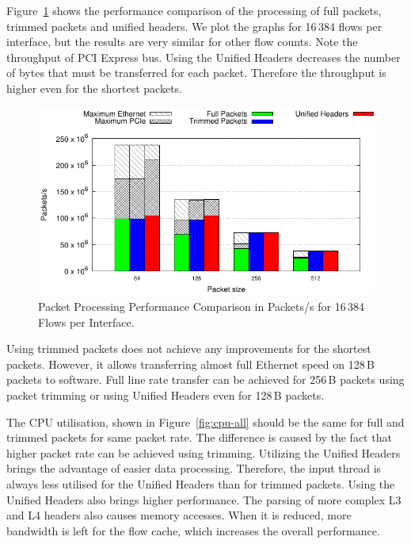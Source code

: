 Figure~\ref{fig:pkt-all} shows the performance comparison of the processing of full packets, trimmed packets and unified headers. We plot the graphs for 16\,384 flows per interface, but the results are very similar for other flow counts. Note the throughput of PCI Express bus. Using the Unified Headers decreases the number of bytes that must be transferred for each packet. Therefore the throughput is higher even for the shortest packets.

\begin{figure}[!htb]
    \centering 
    \includegraphics{figures/paper-highdensity/graphs/packets-all.pdf}
    \caption{Packet Processing Performance Comparison in Packets/s for 16\,384 Flows per Interface.}
    \label{fig:pkt-all}
\end{figure}

Using trimmed packets does not achieve any improvements for the shortest packets. However, it allows transferring almost full Ethernet speed on 128\,B packets to software. Full line rate transfer can be achieved for 256\,B packets using packet trimming or using Unified Headers even for 128\,B packets.

The CPU utilisation, shown in Figure~\ref{fig:cpu-all} should be the same for full and trimmed packets for same packet rate. The difference is caused by the fact that higher packet rate can be achieved using trimming. Utilizing the Unified Headers brings the advantage of easier data processing. Therefore, the input thread is always less utilised for the Unified Headers than for trimmed packets. Using the Unified Headers also brings higher performance. The parsing of more complex L3 and L4 headers also causes memory accesses. When it is reduced, more bandwidth is left for the flow cache, which increases the overall performance.


